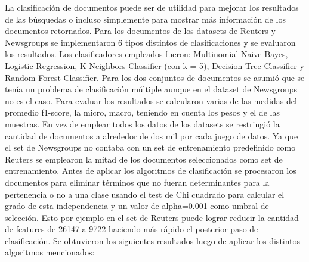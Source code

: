 \documentclass[12pt]{llncs}
\begin{document}
La clasificación de documentos puede ser de utilidad para mejorar los resultados de las búsquedas o incluso simplemente para mostrar más información de los documentos retornados. Para los documentos de los datasets de Reuters y Newsgroups se implementaron 6 tipos distintos de clasificaciones y se evaluaron los resultados. Los clasificadores empleados fueron: Multinomial Naive Bayes, Logistic Regression, K Neighbors Classifier (con k = 5), Decision Tree Classifier y Random Forest Classifier. Para los dos conjuntos de documentos se asumió que se tenía un problema de clasificación múltiple aunque en el dataset de Newsgroups no es el caso. Para evaluar los resultados se calcularon varias de las medidas del promedio f1-score, la micro, macro, teniendo en cuenta los pesos y el de las muestras. En vez de emplear todos los datos de los datasets se restringió la cantidad de documentos a alrededor de dos mil por cada juego de datos. Ya que el set de Newsgroups no contaba con un set de entrenamiento predefinido como Reuters se emplearon la mitad de los documentos seleccionados como set de entrenamiento. Antes de aplicar los algoritmos de clasificación se procesaron los documentos para eliminar términos que no fueran determinantes para la pertenencia o no a una clase usando el test de Chi cuadrado para calcular el grado de esta independencia y un valor de alpha=0.001 como umbral de selección. Esto por ejemplo en el set de Reuters puede lograr reducir la cantidad de features de 26147 a 9722 haciendo más rápido el posterior paso de clasificación. Se obtuvieron los siguientes resultados luego de aplicar los distintos algoritmos mencionados:
\end{document}
